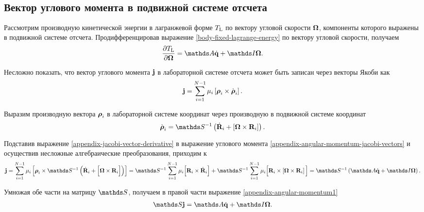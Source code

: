 \begin{subappendices}
    \section{Вектор углового момента в подвижной системе отсчета} \label{appendix:angular-momentum-body-fixed}

    Рассмотрим производную кинетической энергии в лагранжевой форме $T_\text{L}$ по вектору угловой скорости $\boldsymbol{\Omega}$, компоненты которого выражены в подвижной системе отсчета. Продифференцировав выражение \eqref{body-fixed-lagrange-energy} по вектору угловой скорости, получаем 
    \begin{gather}
        \frac{\partial \Tl}{\partial \bOmega} = \bbA \dot{\mf{q}} + \bbI \bOmega. \label{appendix-angular-momentum1}
    \end{gather}

    Несложно показать, что вектор углового момента $\mathbf{j}$ в лабораторной системе отсчета может быть записан через векторы Якоби как
    \begin{gather}
        \mathbf{j} = \sum_{i = 1}^{N - 1} \mu_i \left[ \boldsymbol{\rho}_i \times \dot{\boldsymbol{\rho}}_i \right]. \label{appendix-angular-momentum-jacobi-vectors}
    \end{gather}

    Выразим производную вектора $\boldsymbol{\rho}_i$ в лабораторной системе координат через производную в подвижной системе координат \cite{goldstein}
    \begin{gather}
        \dot{\bs{\rho}}_i = \bbS^{-1} \lb \dot{\mf{R}}_i + \lsq \bs{\Omega} \times \mf{R}_i \rsq \rb. \label{appendix-jacobi-vector-derivative} 
    \end{gather}

    Подставив выражение \eqref{appendix-jacobi-vector-derivative} в выражение углового момента \eqref{appendix-angular-momentum-jacobi-vectors} и осуществив несложные алгебраические преобразования, приходим к 
    \begin{gather}
        \mf{j} = \sum_{i = 1}^{N-1} \mu_i \lsq \bs{\rho}_i \times \bbS^{-1} \lb \dot{\mf{R}}_i + \Big[ \bOmega \times \mf{R}_i \Big] \rb \rsq = \bbS^{-1} \sum_{i = 1}^{N-1} \mu_i \Big[ \mf{R}_i \times \dot{\mf{R}}_i \Big] + \bbS^{-1} \sum_{i = 1}^{N-1} \mu_i \Big[ \mf{R}_i \times \lsq \bOmega \times \mf{R}_i \rsq \Big] = \bbS^{-1} \lb \bbA \dot{\mf{q}} + \bbI \bOmega \rb.
    \end{gather}

    Умножая обе части на матрицу $\bbS$, получаем в правой части выражение \eqref{appendix-angular-momentum1}
    \begin{gather}
        \bbS \mf{j} = \bbA \dot{\mf{q}} + \bbI \bOmega.
    \end{gather}


\end{subappendices}
